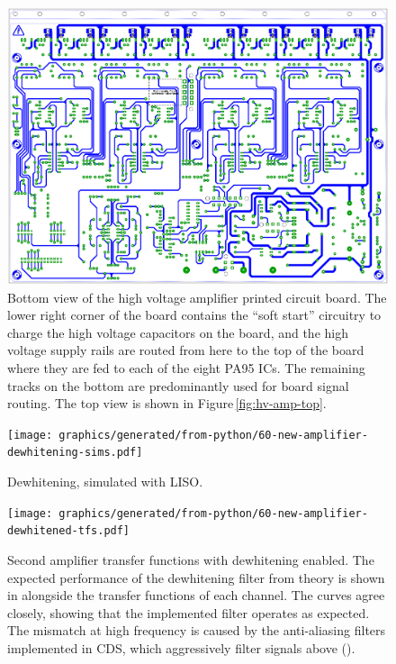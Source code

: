 \begin{figure}
  \centering
  \includegraphics[width=\columnwidth]{graphics/60-hv-amp-bottom.pdf}
  \caption[High voltage amplifier board layout (bottom)]{\label{fig:hv-amp-bottom}Bottom view of the high voltage amplifier printed circuit board. The lower right corner of the board contains the ``soft start'' circuitry to charge the high voltage capacitors on the board, and the high voltage supply rails are routed from here to the top of the board where they are fed to each of the eight PA95 ICs. The remaining tracks on the bottom are predominantly used for board signal routing. The top view is shown in Figure\,\ref{fig:hv-amp-top}.}
\end{figure}

\begin{figure}
  \centering
  \texttt{[image: graphics/generated/from-python/60-new-amplifier-dewhitening-sims.pdf]}
  \caption[Simulated dewhitening filter frequency response]{Dewhitening, simulated with LISO.}
  \label{fig:new-amplifier-dewhitening-sims}
\end{figure}

\begin{figure}
  \centering
  \texttt{[image: graphics/generated/from-python/60-new-amplifier-dewhitened-tfs.pdf]}
  \caption[Frequency response of the high voltage amplifier's channels with dewhitening enabled]{Second amplifier transfer functions with dewhitening enabled. The expected performance of the dewhitening filter from theory is shown in  alongside the transfer functions of each channel. The curves agree closely, showing that the implemented filter operates as expected. The mismatch at high frequency is caused by the anti-aliasing filters implemented in CDS, which aggressively filter signals above  ().}
  \label{fig:new-amplifier-dewhitened-tfs}
\end{figure}

